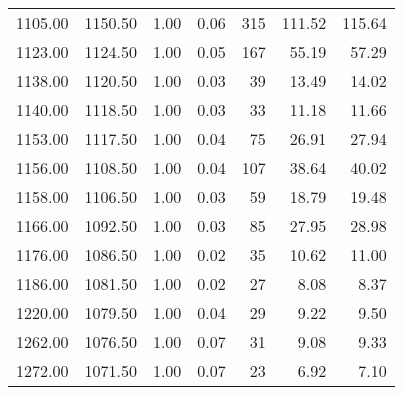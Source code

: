 \begin{table}
\begin{tabular}{rrrrrrr}
1105.00 & 1150.50 & 1.00 & 0.06 & 315 & 111.52 & 115.64 \\
1123.00 & 1124.50 & 1.00 & 0.05 & 167 & 55.19 & 57.29 \\
1138.00 & 1120.50 & 1.00 & 0.03 & 39 & 13.49 & 14.02 \\
1140.00 & 1118.50 & 1.00 & 0.03 & 33 & 11.18 & 11.66 \\
1153.00 & 1117.50 & 1.00 & 0.04 & 75 & 26.91 & 27.94 \\
1156.00 & 1108.50 & 1.00 & 0.04 & 107 & 38.64 & 40.02 \\
1158.00 & 1106.50 & 1.00 & 0.03 & 59 & 18.79 & 19.48 \\
1166.00 & 1092.50 & 1.00 & 0.03 & 85 & 27.95 & 28.98 \\
1176.00 & 1086.50 & 1.00 & 0.02 & 35 & 10.62 & 11.00 \\
1186.00 & 1081.50 & 1.00 & 0.02 & 27 & 8.08 & 8.37 \\
1220.00 & 1079.50 & 1.00 & 0.04 & 29 & 9.22 & 9.50 \\
1262.00 & 1076.50 & 1.00 & 0.07 & 31 & 9.08 & 9.33 \\
1272.00 & 1071.50 & 1.00 & 0.07 & 23 & 6.92 & 7.10 \\
\bottomrule
\end{tabular}
\end{table}
